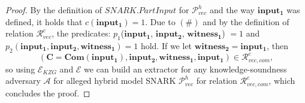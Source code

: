 \begin{proof}
\noindent By the definition of $\mathit{SNARK.PartInput}$ for $\mathscr{P}_{\mathit{vec}}^{h}$ and the way $\mathbf{input_1}$ was defined, 
it holds that $c(\mathbf{input_1}) = 1$. Due to $(\#)$ and by the definition of relation $\mathcal{R}_{\mathit{vec}}^{c}$, 
the predicates: $p_1$($\mathbf{input_1}$, $\mathbf{input_2}$, $\mathbf{witness_1}$) $= 1$ and 
$p_2(\mathbf{input_1}, \mathbf{input_2}, \mathbf{witness_1}) = 1$ hold. If we let 
$\mathbf{witness_2} = \mathbf{input_1}$, then 
$$(\mathbf{C} = \mathbf{Com}(\mathbf{input_1}), \mathbf{input_2}, \mathbf{witness_1}, \mathbf{input_1}) \in \mathcal{R}_{\mathit{vec}, \mathit{com}}^c,$$ so 
using $\mathcal{E}_{\mathit{KZG}}$ and $\mathcal{E}$ we can build an extractor for any knowledge-soundness adversary $\mathcal{A}$ for alleged 
hybrid model SNARK $\mathscr{P}_{\mathit{vec}}^{h}$ for relation $\mathcal{R}_{\mathit{vec}, \mathit{com}}^c$, which concludes the proof.
\end{proof}